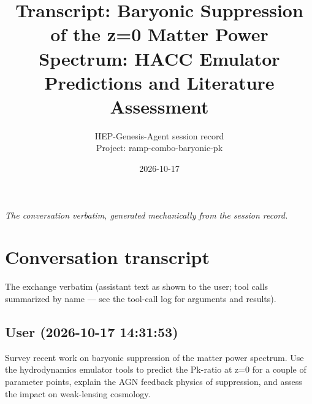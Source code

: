 \documentclass[11pt,a4paper]{article}
\title{Transcript: Baryonic Suppression of the z=0 Matter Power Spectrum: HACC Emulator Predictions and Literature Assessment}
\author{HEP-Genesis-Agent session record \\ \small Project: ramp-combo-baryonic-pk}
\date{2026-10-17}
\begin{document}
\maketitle
\noindent\textit{\small The conversation verbatim, generated mechanically from the session record.}
\vspace{1em}



\appendix
\section{Conversation transcript}
\label{app:transcript}
The exchange verbatim (assistant text as shown to the user; tool calls summarized by name --- see the tool-call log for arguments and results).
\subsection*{User \small(2026-10-17 14:31:53)}
Survey recent work on baryonic suppression of the matter power spectrum. Use the hydrodynamics emulator tools to predict the Pk-ratio at z=0 for a couple of parameter points, explain the AGN feedback physics of suppression, and assess the impact on weak-lensing cosmology.
\end{document}
